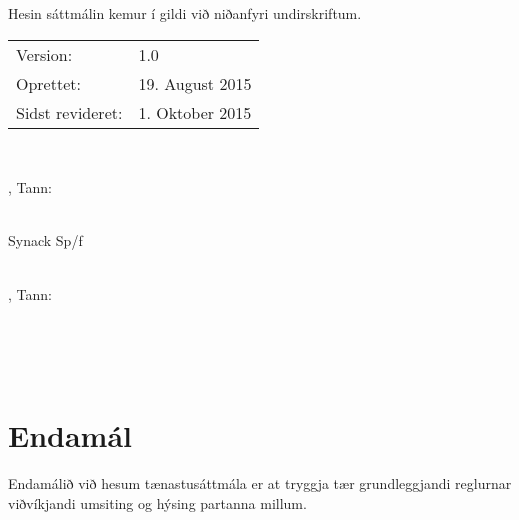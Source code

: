 \vspace{25mm} 
\noindent
Hesin sáttmálin kemur í gildi við niðanfyri undirskriftum. \\

\vspace{5mm}
\noindent
\begin{tabular}[l]{ll}
	Version:		& 1.0 \\
	Oprettet:		& 19. August 2015	\\
	Sidst revideret:& 1. Oktober 2015	\\
\end{tabular} \\ \vspace{5mm} \noindent
\vspace{30mm}

\begin{minipage}{0.5\textwidth}
\begin{center}
		\SynackUnderskriftsLokation, Tann: \underline{\hspace{30mm}}	\\ \vspace{5mm}
		
		\underline{\hspace{62mm}}	\\
		Synack Sp/f \\
		\SynackUnderskriver \\
\end{center}
\end{minipage}
\begin{minipage}{0.5\textwidth}
	\begin{center}
		\KundenUnderskriftsLokation, Tann: \underline{\hspace{30mm}}	\\ \vspace{5mm}
		
		\underline{\hspace{62mm}}	\\
		\Kunden \\
		\KundenKontakt \\
	\end{center}
\end{minipage}
\newpage

\section*{Endamál}
Endamálið við hesum tænastusáttmála er at tryggja tær grundleggjandi reglurnar viðvíkjandi
umsiting og hýsing partanna millum.	\\

